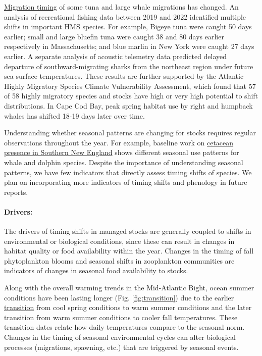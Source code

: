 \documentclass[
  10pt,
]{article}
\begin{document}
\newpage

\href{https://noaa-edab.github.io/catalog/timing_shifts.html}{Migration timing} of some tuna and large whale migrations has changed. An analysis of recreational fishing data between 2019 and 2022 identified multiple shifts in important HMS species. For example, Bigeye tuna were caught 50 days earlier; small and large bluefin tuna were caught 38 and 80 days earlier respectively in Massachusetts; and blue marlin in New York were caught 27 days earlier. A separate analysis of acoustic telemetry data predicted delayed departure of southward-migrating sharks from the northeast region under future sea surface temperatures. These results are further supported by the Atlantic Highly Migratory Species Climate Vulnerability Assessment, which found that 57 of 58 highly migratory species and stocks have high or very high potential to shift distributions. In Cape Cod Bay, peak spring habitat use by right and humpback whales has shifted 18-19 days later over time.

Understanding whether seasonal patterns are changing for stocks requires regular observations throughout the year. For example, baseline work on \href{https://noaa-edab.github.io/catalog/cetacean_acoustic.html}{cetacean presence in Southern New England} shows different seasonal use patterns for whale and dolphin species. Despite the importance of understanding seasonal patterns, we have few indicators that directly assess timing shifts of species. We plan on incorporating more indicators of timing shifts and phenology in future reports.

\paragraph{Drivers:}\label{drivers-1}

The drivers of timing shifts in managed stocks are generally coupled to shifts in environmental or biological conditions, since these can result in changes in habitat quality or food availability within the year. Changes in the timing of fall phytoplankton blooms and seasonal shifts in zooplankton communities are indicators of changes in seasonal food availability to stocks.

Along with the overall warming trends in the Mid-Atlantic Bight, ocean summer conditions have been lasting longer (Fig. \ref{fig:transition}) due to the earlier \href{https://noaa-edab.github.io/catalog/trans_dates.html}{transition} from cool spring conditions to warm summer conditions and the later transition from warm summer conditions to cooler fall temperatures. These transition dates relate how daily temperatures compare to the seasonal norm. Changes in the timing of seasonal environmental cycles can alter biological processes (migrations, spawning, etc.) that are triggered by seasonal events.
\end{document}

